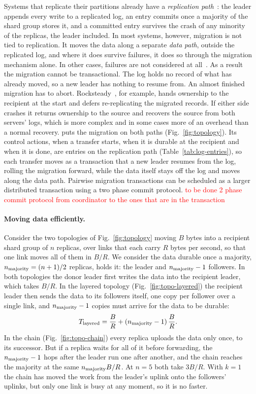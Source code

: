 Systems that replicate their partitions already have a \emph{replication path}~\cite{raft,paxos-simple}: the leader appends every write to a
replicated log, an entry commits once a majority of the shard group stores it, and a committed
entry survives the crash of any minority of the replicas, the leader included.
In most systems, however, migration is not tied to replication.
It moves the data along a separate \emph{data path}, outside the replicated log, and where it
does survive failures, it does so through the migration mechanism alone.
In other cases, failures are not considered at all~\cite{netmigrate}.
As a result the migration cannot be transactional.
The log holds no record of what has already moved, so a new leader has nothing to resume
from.
An almost finished migration has to abort.
Rocksteady~\cite{rocksteady}, for example, hands ownership to the recipient at the start and
defers re-replicating the migrated records.
If either side crashes it returns ownership to the
source and recovers the source from both servers' logs, which is more complex and in some cases
more of an overhead than a normal recovery.
\OurImplementation{} puts the migration on both paths (Fig.~\ref{fig:topology}).
Its control actions, when a transfer starts, when it is durable at the recipient and when it
is done, are entries on the replication path (Table~\ref{tab:log-entries}), so each transfer
moves as a transaction that a new leader resumes from the log, rolling the migration forward,
while the data itself stays off the log and moves along the data path. 
Pairwise migration transactions can be scheduled as a larger distributed transaction using a two phase commit protocol.
\textcolor{red}{to be done 2 phase commit protocol from coordinator to the ones that are in the transaction}

\paragraph{Moving data efficiently.}
Consider the two topologies of Fig.~\ref{fig:topology} moving $B$ bytes into a
recipient shard group of $n$ replicas, over links that each carry $R$ bytes per second, so
that one link moves all of them in $B/R$.
We consider the data durable once a majority, $n_{\mathrm{majority}} = (n+1)/2$ replicas, holds it: the leader
and $n_{\mathrm{majority}} - 1$ followers.
In both topologies the donor leader first writes the data into the recipient leader, which
takes $B/R$.
In the layered topology (Fig.~\ref{fig:topo-layered}) the recipient leader then sends the
data to its followers itself, one copy per follower over a single link, and $n_{\mathrm{majority}} - 1$ copies must arrive for the data to be durable:
\begin{equation}
  T_{\mathrm{layered}} = \frac{B}{R} + (n_{\mathrm{majority}} - 1)\,\frac{B}{R}.
  \label{eq:layered}
\end{equation}
In the chain (Fig.~\ref{fig:topo-chain}) every replica uploads the data only once, to its
successor.
But if a replica waits for all of it before forwarding, the $n_{\mathrm{majority}} - 1$ hops after
the leader run one after another, and the chain reaches the majority at the same
$n_{\mathrm{majority}} B/R$.
At $n=5$ both take $3B/R$.
With $k=1$ the chain has moved the work from the leader's uplink onto the followers'
uplinks, but only one link is busy at any moment, so it is no faster.

